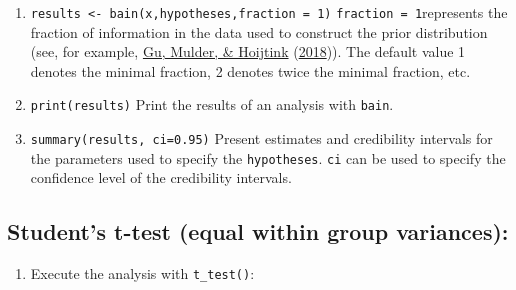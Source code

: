 \documentclass[
]{book}
\newenvironment{Shaded}{\begin{snugshade}}{\end{snugshade}}
\newcommand{\AttributeTok}[1]{\textcolor[rgb]{0.77,0.63,0.00}{#1}}
\newcommand{\CommentTok}[1]{\textcolor[rgb]{0.56,0.35,0.01}{\textit{#1}}}
\newcommand{\ConstantTok}[1]{\textcolor[rgb]{0.00,0.00,0.00}{#1}}
\newcommand{\DecValTok}[1]{\textcolor[rgb]{0.00,0.00,0.81}{#1}}
\newcommand{\FunctionTok}[1]{\textcolor[rgb]{0.00,0.00,0.00}{#1}}
\newcommand{\NormalTok}[1]{#1}
\newcommand{\OtherTok}[1]{\textcolor[rgb]{0.56,0.35,0.01}{#1}}
\newcommand{\SpecialCharTok}[1]{\textcolor[rgb]{0.00,0.00,0.00}{#1}}
\providecommand{\tightlist}{%
  \setlength{\itemsep}{0pt}\setlength{\parskip}{0pt}}
\begin{document}
\begin{enumerate}
\def\labelenumi{\arabic{enumi})}
\setcounter{enumi}{2}
\item
  \texttt{results\ \textless{}-\ bain(x,hypotheses,fraction\ =\ 1)}
  \texttt{fraction\ =\ 1}represents the fraction of information in the data used to construct the prior distribution (see, for example, \protect\hyperlink{ref-gu2018approximated}{Gu, Mulder, \& Hoijtink} (\protect\hyperlink{ref-gu2018approximated}{2018})). The default value 1 denotes the minimal fraction, 2 denotes twice the minimal fraction, etc.
\item
  \texttt{print(results)} Print the results of an analysis with
  \texttt{bain}.
\item
  \texttt{summary(results,\ ci=0.95)} Present estimates and credibility intervals for the parameters used to specify the \texttt{hypotheses}. \texttt{ci} can be used to specify the confidence level of the credibility intervals.
\end{enumerate}

\hypertarget{students-t-test-equal-within-group-variances}{%
\subsection{Student's t-test (equal within group variances):}\label{students-t-test-equal-within-group-variances}}

\begin{enumerate}
\def\labelenumi{\arabic{enumi})}
\tightlist
\item
  Execute the analysis with \texttt{t\_test()}:
\end{enumerate}

\begin{Shaded}
\end{Shaded}
\end{document}
